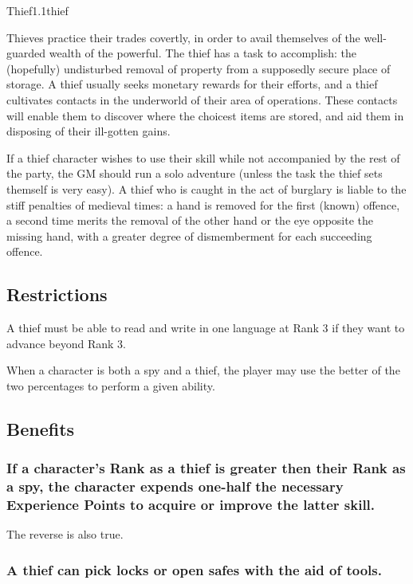 \begin{skill}{Thief}{1.1}{thief}

Thieves practice their trades covertly, in order to avail themselves
of the well-guarded wealth of the powerful.  The thief has a task to
accomplish: the (hopefully) undisturbed removal of property from a
supposedly secure place of storage.  A thief usually seeks monetary
rewards for their efforts, and a thief cultivates contacts in the
underworld of their area of operations.  These contacts will enable
them to discover where the choicest items are stored, and aid them in
disposing of their ill-gotten gains.

If a thief character wishes to use their skill while not accompanied
by the rest of the party, the GM should run a solo adventure (unless
the task the thief sets themself is very easy). A thief who is caught
in the act of burglary is liable to the stiff penalties of medieval
times: a hand is removed for the first (known) offence, a second time
merits the removal of the other hand or the eye opposite the missing
hand, with a greater degree of dismemberment for each succeeding
offence.

\subsection{Restrictions}

A thief must be able to read and write in one language at Rank 3 if
they want to advance beyond Rank 3.

When a character is both a spy and a thief, the player may use the
better of the two percentages to perform a given ability.

\subsection{Benefits}

\subsubsection{If a character's Rank as a thief is greater then their
Rank as a spy, the character expends one-half the necessary Experience
Points to acquire or improve the latter skill.}

The reverse is also true.

\subsubsection{A thief can pick locks or open safes with the aid of
tools.}
\label{thief:picklocks}


\end{skill}
